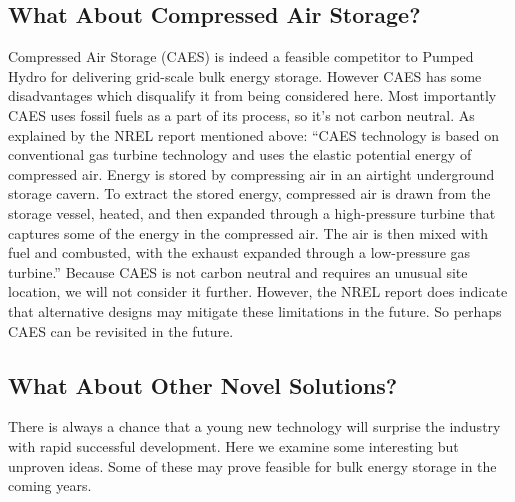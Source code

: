 \documentclass[hidelinks,12pt,a4paper]{article}
\begin{document}
\subsection{What About Compressed Air Storage?}
Compressed Air Storage (CAES) is indeed a feasible competitor to Pumped Hydro for delivering grid-scale bulk energy storage. However CAES has some disadvantages which disqualify it from being considered here. Most importantly CAES uses fossil fuels as a part of its process, so it's not carbon neutral. As explained by the NREL report mentioned above: “CAES technology is based on conventional gas turbine technology and uses the elastic potential energy of compressed air. Energy is stored by compressing air in an airtight underground storage cavern. To extract the stored energy, compressed air is drawn from the storage vessel, heated, and then expanded through a high-pressure turbine that captures some of the energy in the compressed air. The air is then mixed with fuel and combusted, with the exhaust expanded through a low-pressure gas turbine.” \cite{TheRoleOfEnergyStorageWithRenewableElectricityGeneration} Because CAES is not carbon neutral and requires an unusual site location, we will not consider it further. However, the NREL report does indicate that alternative designs may mitigate these limitations in the future. So perhaps CAES can be revisited in the future.

\subsection{What About Other Novel Solutions?}
There is always a chance that a young new technology will surprise the industry with rapid successful development. Here we examine some interesting but unproven ideas. Some of these may prove feasible for bulk energy storage in the coming years.
\end{document}
